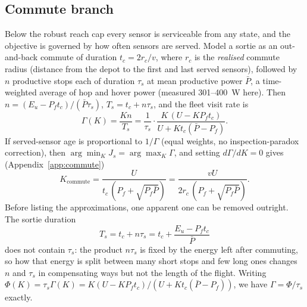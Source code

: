 \documentclass[journal,outdir=./]{IEEEtran}
\newcommand{\Kc}{K_{\mathrm{commute}}}
\newcommand{\rc}{r_{c}}
\newcommand{\Pbar}{\bar{P}}
\newcommand{\Pf}{P_{f}}
\newcommand{\Eu}{E_{u}}
\newcommand{\Gam}{\Gamma}
\begin{document}
\subsection{Commute branch}\label{sec:law:commute}
Below the robust reach cap every sensor is serviceable from any state, and the objective is governed by how often sensors are served. Model a sortie as an out-and-back commute of duration $t_c=2\rc/v$, where $\rc$ is the \emph{realised} commute radius (distance from the depot to the first and last served sensors), followed by $n$ productive stops each of duration $\tau_s$ at mean productive power $\Pbar$, a time-weighted average of hop and hover power (measured 301--400~W here). Then $n=(\Eu-\Pf t_c)/(\Pbar\tau_s)$, $T_s=t_c+n\tau_s$, and the fleet visit rate is
\begin{equation}\label{eq:R}
\Gam(K)=\frac{Kn}{T_s}=\frac{1}{\tau_s}\cdot\frac{K\,(U-K\Pf t_c)}{U+K t_c(\Pbar-\Pf)}.
\end{equation}
If served-sensor age is proportional to $1/\Gam$ (equal weights, no inspection-paradox correction), then $\arg\min_K J_s=\arg\max_K \Gam$, and setting $d\Gam/dK=0$ gives (Appendix~\ref{app:commute})
\begin{equation}\label{eq:Kcommute}
\Kc=\frac{U}{t_c\,(\Pf+\sqrt{\Pf\Pbar})}=\frac{vU}{2\rc\,(\Pf+\sqrt{\Pf\Pbar})}.
\end{equation}
Before listing the approximations, one apparent one can be removed outright. The sortie duration
\[
T_s=t_c+n\tau_s=t_c+\frac{\Eu-\Pf t_c}{\Pbar}
\]
does not contain $\tau_s$: the product $n\tau_s$ is fixed by the energy left after commuting, so how that energy is split between many short stops and few long ones changes $n$ and $\tau_s$ in compensating ways but not the length of the flight. Writing $\Phi(K)=\tau_s\Gam(K)=K(U-K\Pf t_c)/(U+Kt_c(\Pbar-\Pf))$, we have $\Gam=\Phi/\tau_s$ exactly.
\end{document}
